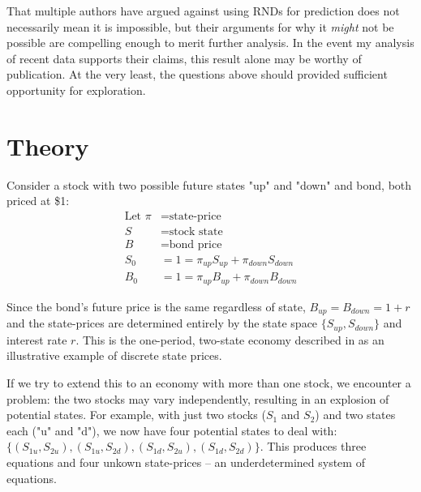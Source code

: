 \documentclass[final,3p,times,authoryear]{elsarticle}
\begin{document}
  That multiple authors have argued against using RNDs for prediction does not necessarily mean it is impossible, but their arguments for why it \textit{might} not be possible are compelling enough to merit further analysis. In the event my analysis of recent data supports their claims, this result alone may be worthy of publication. At the very least, the questions above should provided sufficient opportunity for exploration.

\section{Theory}
  \label{theory}
  Consider a stock with two possible future states "up" and "down" and bond, both priced at \$1:
  \begin{align}
    \text{Let } \pi &= \text{state-price}\\
    S &= \text{stock state}\\
    B &= \text{bond price}\\
    S_0 &= 1 = \pi_{up} S_{up} + \pi_{down} S_{down}\\
    B_0 &= 1 = \pi_{up} B_{up} + \pi_{down} B_{down}
  \end{align}

  Since the bond's future price is the same regardless of state, $B_{up} = B_{down} = 1 + r$ and the state-prices are determined entirely by the state space $\{S_{up}, S_{down}\}$ and interest rate $r$. This is the one-period, two-state economy described in \citet{jackwerth_option-implied_2004} as an illustrative example of discrete state prices.

  If we try to extend this to an economy with more than one stock, we encounter a problem: the two stocks may vary independently, resulting in an explosion of potential states. For example, with just two stocks ($S_1$ and $S_2$) and two states each ("u" and "d"), we now have four potential states to deal with: $\{(S_{1u}, S_{2u}), (S_{1u}, S_{2d}), (S_{1d}, S_{2u}), (S_{1d}, S_{2d})\}$. This produces three equations and four unkown state-prices -- an underdetermined system of equations. 
\end{document}
